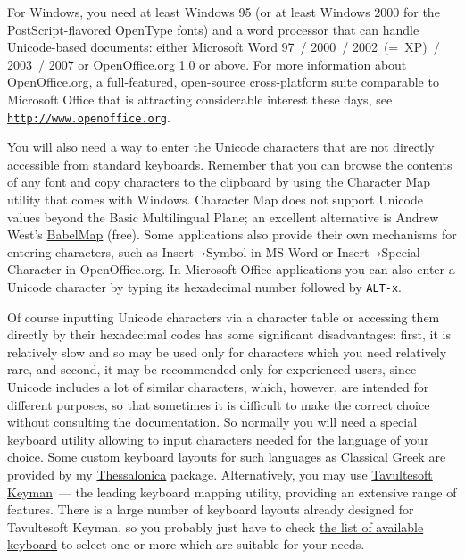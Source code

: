 \documentclass[12pt,a4paper,openany]{book}
\begin{document}
For Windows, you need at least Windows 95 (or at least Windows 2000 for the
PostScript-flavored OpenType fonts) and a word processor that can handle
Unicode-based documents: either Microsoft Word 97~/ 2000~/ 2002~(=~XP)~/
2003~/ 2007 or OpenOffice.org 1.0 or above. For more information about
OpenOffice.org, a full-featured, open-source cross-platform suite
comparable to Microsoft Office that is attracting considerable interest
these days, see
\href{http://www.openoffice.org}{\texttt{http://www.openoffice.org}}.

You will also need a way to enter the Unicode characters that are not
directly accessible from standard keyboards. Remember that you can browse
the contents of any font and copy characters to the clipboard by using the
Character Map utility that comes with Windows. Character Map does not
support Unicode values beyond the Basic Multilingual Plane; an excellent
alternative is Andrew West’s
\href{http://www.babelstone.co.uk/Software/BabelMap.html}{BabelMap}
(free). Some applications also provide their own mechanisms for entering
characters, such as Insert→Symbol in MS Word or Insert→Special Character
in OpenOffice.org. In Microsoft Office applications you can also enter 
a Unicode character by typing its hexadecimal number followed by
\texttt{ALT-x}.

Of course inputting Unicode characters via a character table or accessing
them directly by their hexadecimal codes has some significant
disadvantages: first, it is relatively slow and so may be used only for
characters which you need relatively rare, and second, it may be
recommended only for experienced users, since Unicode includes a lot of
similar characters, which, however, are intended for different purposes, so
that sometimes it is difficult to make the correct choice without
consulting the documentation. So normally you will need a special keyboard
utility allowing to input characters needed for the language of your
choice. Some custom keyboard layouts for such languages as Classical Greek
are provided by my \href{http://www.thessalonica.org.ru}{Thessalonica}
package. Alternatively, you may use
\href{http://www.tavultesoft.com/keyman/}{Tavultesoft Keyman}~— the
leading keyboard mapping utility, providing an extensive range of features.
There is a large number of keyboard layouts already designed for
Tavultesoft Keyman, so you probably just have to check
\href{http://www.tavultesoft.com/keyman/downloads/keyboards/}{the list of
available keyboard} to select one or more which are suitable for your
needs.
\end{document}
